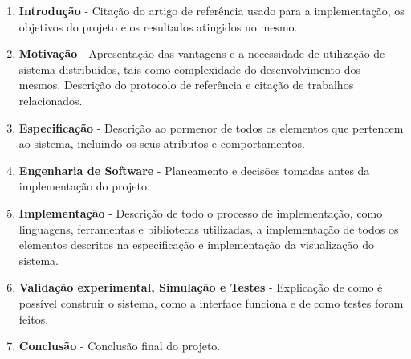 \begin{enumerate}
    \item \textbf{Introdução} - Citação do artigo de referência usado para a implementação, os objetivos do projeto e os resultados atingidos no mesmo.
    \item \textbf{Motivação} - Apresentação das vantagens e a necessidade de utilização de sistema distribuídos, tais como complexidade do desenvolvimento dos mesmos. Descrição do protocolo de referência e citação de trabalhos relacionados.
    \item \textbf{Especificação} - Descrição ao pormenor de todos os elementos que pertencem ao sistema, incluindo os seus atributos e comportamentos.
    \item \textbf{Engenharia de Software} - Planeamento e decisões tomadas antes da implementação do projeto. 
    \item \textbf{Implementação} - Descrição de todo o processo de implementação,
	como linguagens, ferramentas e bibliotecas utilizadas,
	a implementação de todos os elementos descritos na especificação e implementação da visualização do sistema.
    \item \textbf{Validação experimental, Simulação e Testes} - Explicação de como é possível construir o sistema, como a interface funciona e de como testes foram feitos.
    \item \textbf{Conclusão} - Conclusão final do projeto.

\end{enumerate}
